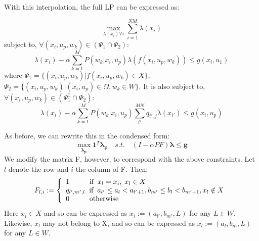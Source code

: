 \documentclass[conference]{IEEEtran}
\begin{document}
With this interpolation, the full LP can be expressed as:

\begin{equation} \label{eq:interpLP}
\max_{\lambda(x_{i}) \forall i} \sum_{i=1}^{NM} \lambda(x_{i})
\end{equation} subject to, $\forall (x_{i}, u_{p}, w_{k})\in(\Psi_{1}\cap\Psi_{2})$:
\begin{displaymath}
    \lambda(x_{i})-\alpha\sum_{k=1}^{M}P(w_{k} | x_{i},u_{p})\lambda(f(x_{i},u_{p},w_{k})) \leq g(x_{i},u_{1})
\end{displaymath} where $\Psi_{1}=\{(x_{i}, u_{p}, w_{k})|f(x_{i}, u_{p}, w_{k})\in X\}$, $\Psi_{2}=\{(x_{i}, u_{p}, w_{k})|(x_{i}, u_{p})\in\Omega, w_{k}\in W\}$. It is also subject to, $\forall (x_{i}, u_{p}, w_{k})\in(\Psi_{1}^\complement\cap\Psi_{2})$:
\begin{displaymath}
    \lambda(x_{i})-\alpha\sum_{k=1}^{M}P(w_{k} | x_{i},u_{p})\sum_{i'}^{MN}q_{i',j}\lambda(x_{i'}) \leq g(x_{i},u_{p})
\end{displaymath}

As before, we can rewrite this in the condensed form:
\begin{equation}
    \max_{\boldsymbol{\lambda_{p}}} \boldsymbol{1}^{T} \boldsymbol{\lambda_{p}}
    \hspace{1em}s.t.\hspace{1em}
    (I-\alpha PF)\boldsymbol{\lambda} \leq \boldsymbol{g}
\end{equation} We modify the matrix F, however, to correspond with the above constraints. Let $l$ denote the row and $i$ the column of F. Then:
\begin{displaymath}
F_{l,i}:=
\left\{
\begin{array}{l}
1		   \hspace{1cm} \text{if} \hspace{0.2cm}x_{l}=x_{i}, \hspace{0.1cm}x_{l}\in X\\
q_{l',m',l}\hspace{0.2cm} \text{if} \hspace{0.2cm} a_{l'}\leq a_{l}< a_{l'+1}, b_{m'}\leq b_{l}< b_{m'+1}, x_{l}\notin X\\
0		   \hspace{1cm} \text{otherwise}
\end{array}
\right.
\end{displaymath} Here $x_{i}\in X$ and so can be expressed as $x_{i}:=(a_{l'},b_{m'},L)$ for any $L\in W$. Likewise, $x_{l}$ may not belong to X, and so can be expressed as $x_{l}:=(a_{l},b_{m},L)$ for any $L\in W$.
\end{document}
